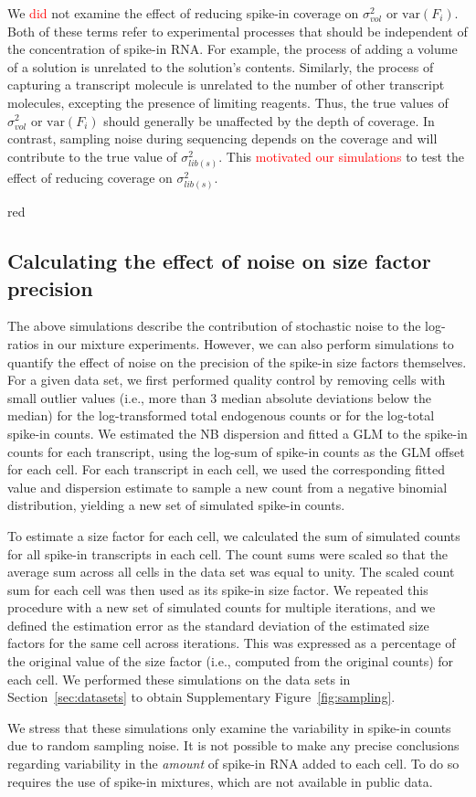 \documentclass{article}
\newcommand\revised[1]{\textcolor{red}{#1}}
\newcommand\variance{\mbox{var}}
\begin{document}
We \revised{did} not examine the effect of reducing spike-in coverage on $\sigma^2_{vol}$ or $\variance(F_i)$.
Both of these terms refer to experimental processes that should be independent of the concentration of spike-in RNA.
For example, the process of adding a volume of a solution is unrelated to the solution's contents.
Similarly, the process of capturing a transcript molecule is unrelated to the number of other transcript molecules, excepting the presence of limiting reagents.
Thus, the true values of $\sigma^2_{vol}$ or $\variance(F_i)$ should generally be unaffected by the depth of coverage.
In contrast, sampling noise during sequencing depends on the coverage and will contribute to the true value of $\sigma^2_{lib(s)}$.
This \revised{motivated our simulations} to test the effect of reducing coverage on $\sigma^2_{lib(s)}$.

\begin{color}{red}
\subsection{Calculating the effect of noise on size factor precision}
The above simulations describe the contribution of stochastic noise to the log-ratios in our mixture experiments.
However, we can also perform simulations to quantify the effect of noise on the precision of the spike-in size factors themselves.
For a given data set, we first performed quality control by removing cells with small outlier values (i.e., more than 3 median absolute deviations below the median) for the log-transformed total endogenous counts or for the log-total spike-in counts.
We estimated the NB dispersion and fitted a GLM to the spike-in counts for each transcript, using the log-sum of spike-in counts as the GLM offset for each cell.
For each transcript in each cell, we used the corresponding fitted value and dispersion estimate to sample a new count from a negative binomial distribution, yielding a new set of simulated spike-in counts.

To estimate a size factor for each cell, we calculated the sum of simulated counts for all spike-in transcripts in each cell.
The count sums were scaled so that the average sum across all cells in the data set was equal to unity.
The scaled count sum for each cell was then used as its spike-in size factor.
We repeated this procedure with a new set of simulated counts for multiple iterations, and we defined the estimation error as the standard deviation of the estimated size factors for the same cell across iterations. 
This was expressed as a percentage of the original value of the size factor (i.e., computed from the original counts) for each cell.
We performed these simulations on the data sets in Section~\ref{sec:datasets} to obtain Supplementary Figure~\ref{fig:sampling}.

We stress that these simulations only examine the variability in spike-in counts due to random sampling noise. 
It is not possible to make any precise conclusions regarding variability in the \textit{amount} of spike-in RNA added to each cell.
To do so requires the use of spike-in mixtures, which are not available in public data.
\end{color}
\end{document}

